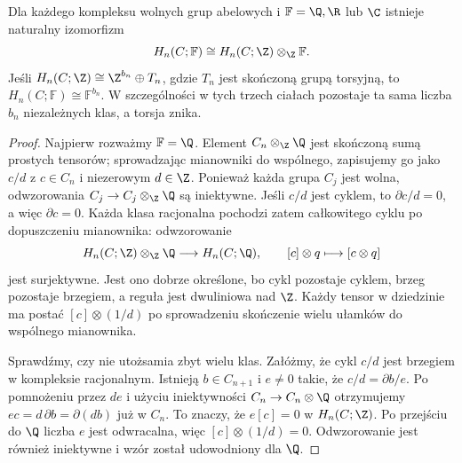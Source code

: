 \begin{twierdzenie}
\label{thm:homologia-char-zero}
Dla każdego kompleksu wolnych grup abelowych
i $\mathbb F=\Q,\R$ lub $\C$ istnieje naturalny
izomorfizm
\begin{equation}\label{eq:homologia-char-zero}
 H_n(C;\mathbb F)
 \cong H_n(C;\Z)\otimes_{\Z}\mathbb F.
\end{equation}
Jeśli $H_n(C;\Z)\cong\Z^{b_n}\oplus T_n$,
gdzie $T_n$ jest skończoną grupą torsyjną, to
$H_n(C;\mathbb F)\cong\mathbb F^{b_n}$.
W szczególności w tych trzech ciałach
pozostaje ta sama liczba $b_n$ niezależnych
klas, a torsja znika.
\end{twierdzenie}
\begin{proof}
Najpierw rozważmy $\mathbb F=\Q$.
Element $C_n\otimes_{\Z}\Q$ jest skończoną
sumą prostych tensorów; sprowadzając
mianowniki do wspólnego, zapisujemy go jako
$c/d$ z $c\in C_n$ i niezerowym
$d\in\Z$. Ponieważ każda grupa $C_j$
jest wolna, odwzorowania
$C_j\to C_j\otimes_{\Z}\Q$ są iniektywne.
Jeśli $c/d$ jest cyklem, to
$\partial c/d=0$, a więc $\partial c=0$.
Każda klasa racjonalna pochodzi zatem
całkowitego cyklu po dopuszczeniu mianownika:
odwzorowanie
\[
 H_n(C;\Z)\otimes_{\Z}\Q\longrightarrow H_n(C;\Q),
 \qquad [c]\otimes q\longmapsto[c\otimes q]
\]
jest surjektywne. Jest ono dobrze określone,
bo cykl pozostaje cyklem, brzeg pozostaje
brzegiem, a reguła jest dwuliniowa nad $\Z$.
Każdy tensor w dziedzinie ma postać $[c]\otimes(1/d)$
po sprowadzeniu skończenie wielu ułamków do wspólnego mianownika.

Sprawdźmy, czy nie utożsamia zbyt wielu klas.
Załóżmy, że cykl $c/d$ jest brzegiem
w kompleksie racjonalnym. Istnieją
$b\in C_{n+1}$ i $e\ne0$ takie, że
$c/d=\partial b/e$. Po pomnożeniu przez
$de$ i użyciu iniektywności
$C_n\to C_n\otimes\Q$ otrzymujemy
$ec=d\,\partial b=\partial(db)$
już w $C_n$. To znaczy, że $e[c]=0$
w $H_n(C;\Z)$. Po przejściu do $\Q$
liczba $e$ jest odwracalna, więc
$[c]\otimes(1/d)=0$. Odwzorowanie jest
również iniektywne i wzór został
udowodniony dla $\Q$.


\end{proof}
